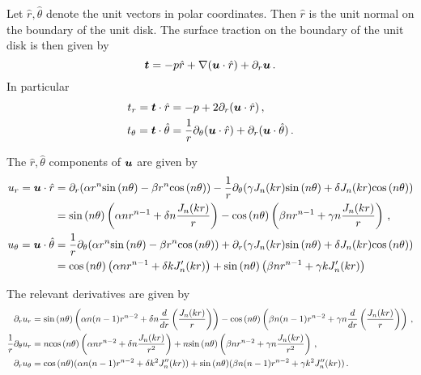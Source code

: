 Let $\hat{r}, \hat{\theta}$ denote the unit vectors in polar coordinates.
Then  $\hat{r}$ is the unit normal on the boundary of the unit disk.
The surface traction on the boundary of the unit disk is then given by 
\begin{equation}
{\boldsymbol t} = -p \hat{r} + \nabla ({\boldsymbol u} \cdot \hat{r}) + \partial_{r} {\boldsymbol u} \, .
\end{equation}
In particular
\begin{equation}
\begin{aligned}
t_{r} = {\boldsymbol t} \cdot \hat{r} &= -p + 2\partial_{r} ({\boldsymbol u} \cdot \hat{r}) \, , \\
t_{\theta} = {\boldsymbol t} \cdot \hat{\theta} &= \frac{1}{r}\partial_{\theta}({\boldsymbol u} \cdot \hat{r}) + \partial_{r} ({\boldsymbol u} \cdot \hat{\theta}) \, .
\end{aligned}
\end{equation}

The $\hat{r},\hat{\theta}$ components of ${\boldsymbol u}$ are given by
\begin{equation}
\begin{aligned}
u_{r} = {\boldsymbol u} \cdot \hat{r} &= \partial_{r} (\alpha r^{n} {\sin{(n \theta)}} - \beta r^{n} {\cos{(n \theta)}}) 
- \frac{1}{r}\partial_{\theta}(\gamma J_{n}(kr) {\sin{(n \theta)}} + \delta J_{n}(kr) {\cos{(n \theta)}}) \\
&= {\sin{(n \theta)}} \left(\alpha n r^{n-1} + \delta n \frac{J_{n}(kr)}{r} \right) 
  - {\cos{(n \theta)}} \left(\beta n r^{n-1} + \gamma n \frac{J_{n}(kr)}{r} \right) \, , \\
u_{\theta} = {\boldsymbol u} \cdot \hat{\theta} &= \frac{1}{r} \partial_{\theta} (\alpha r^{n} {\sin{(n \theta)}} - \beta r^{n} {\cos{(n \theta)}})
+ \partial_{r} (\gamma J_{n}(kr) {\sin{(n \theta)}} + \delta J_{n}(kr) {\cos{(n \theta)}}) \\ 
&= {\cos{(n \theta)}} \left( \alpha n r^{n-1} + \delta k J_{n}'(kr) \right) + {\sin{(n \theta)}} \left( \beta n r^{n-1} + \gamma k J_{n}'(kr) \right)
\end{aligned}
\end{equation}

The relevant derivatives are given by
\begin{equation}
\begin{aligned}
\partial_{r} u_{r} &= {\sin{(n \theta)}} \left( \alpha n (n-1) r^{n-2} + \delta n \frac{d}{dr} \left(\frac{J_{n}(kr)}{r}\right) \right)
- {\cos{(n \theta)}} \left( \beta n (n-1) r^{n-2} + \gamma n \frac{d}{dr} \left( \frac{J_{n}(kr)}{r} \right) \right) \, , \\
\frac{1}{r} \partial_{\theta} u_{r} &= n {\cos{(n \theta)}} \left(\alpha n r^{n-2} + \delta n \frac{J_{n}(kr)}{r^2} \right) + 
n {\sin{(n \theta)}} \left(\beta n r^{n-2} + \gamma n\frac{J_{n}(kr)}{r^2} \right) \, , \\
\partial_{r} u_{\theta} &= {\cos{(n \theta)}}(\alpha n(n-1) r^{n-2} + \delta k^2 J_{n}''(kr)) + 
{\sin{(n \theta)}} (\beta n(n-1)r^{n-2} + \gamma k^2 J_{n}''(kr)) \, .
\end{aligned}
\end{equation}

